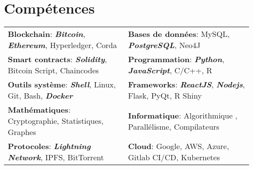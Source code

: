 \documentclass[10pt]{article}
\begin{document}
\section*{Compétences}
\begin{tabular}{ l l }
\textbf{Blockchain}: \textbf{\textit{Bitcoin}}, \textbf{\textit{Ethereum}}, Hyperledger, Corda & \textbf{Bases de données}: MySQL, \textbf{\textit{PostgreSQL}}, Neo4J \\[0.1cm]
\textbf{Smart contracts}: \textbf{\textit{Solidity}}, Bitcoin Script, Chaincodes & \textbf{Programmation}: \textbf{\textit{Python}}, \textbf{\textit{JavaScript}}, C/C++, R  \\[0.1cm]
\textbf{Outils système}: \textbf{\textit{Shell}}, Linux, Git, Bash, \textbf{\textit{Docker}} & \textbf{Frameworks}: \textbf{\textit{ReactJS}}, \textbf{\textit{Nodejs}}, Flask, PyQt, R Shiny \\[0.1cm]
\textbf{Mathématiques}: Cryptographie, Statistiques, Graphes & \textbf{Informatique}: Algorithmique , Parallélisme, Compilateurs \\[0.1cm]
\textbf{Protocoles}: \textbf{\textit{Lightning Network}}, IPFS, BitTorrent & \textbf{Cloud}: Google, AWS, Azure, Gitlab CI/CD, Kubernetes
\end{tabular}



\end{document}
